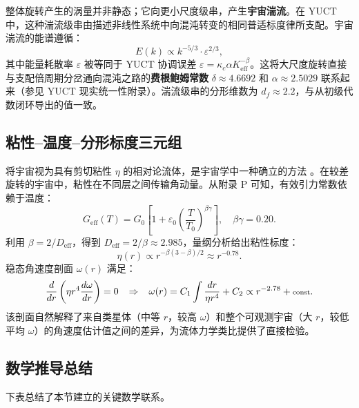 \documentclass[11pt,a4paper]{article}
\begin{document}
	整体旋转产生的涡量并非静态；它向更小尺度级串，产生\textbf{宇宙湍流}。在 YUCT 中，这种湍流级串由描述非线性系统中向混沌转变的相同普适标度律所支配。宇宙湍流的能谱遵循：
	\begin{equation}
		E(k) \propto k^{-5/3} \cdot \varepsilon^{2/3},
	\end{equation}
	其中能量耗散率 \(\varepsilon\) 被等同于 YUCT 协调误差 \(\varepsilon = \kappa_c \alpha K_{\mathrm{eff}}^{-\beta}\)。这将大尺度旋转直接与支配倍周期分岔通向混沌之路的\textbf{费根鲍姆常数} \(\delta \approx 4.6692\) 和 \(\alpha \approx 2.5029\) 联系起来（参见 YUCT 现实统一性附录）。湍流级串的分形维数为 \(d_f \approx 2.2\)，与从初级代数闭环导出的值一致。
	
	\subsection{粘性–温度–分形标度三元组}
	
	将宇宙视为具有剪切粘性 \(\eta\) 的相对论流体，是宇宙学中一种确立的方法 \cite{Giovannini2005}。在较差旋转的宇宙中，粘性在不同层之间传输角动量。从附录 P 可知，有效引力常数依赖于温度：
	\begin{equation}
		G_{\mathrm{eff}}(T) = G_0\left[1 + \varepsilon_0\left(\frac{T}{T_0}\right)^{\beta\gamma}\right], \quad \beta\gamma = 0.20.
	\end{equation}
	利用 \(\beta = 2/D_{\mathrm{eff}}\)，得到 \(D_{\mathrm{eff}} = 2/\beta \approx 2.985\)，量纲分析给出粘性标度：
	\begin{equation}
		\eta(r) \propto r^{-\beta(3-\beta)/2} \approx r^{-0.78}.
	\end{equation}
	稳态角速度剖面 \(\omega(r)\) 满足：
	\begin{equation}
		\scriptsize
		\frac{d}{dr}\left( \eta r^4 \frac{d\omega}{dr} \right) = 0 \quad \Rightarrow \quad \omega(r) = C_1 \int \frac{dr}{\eta r^4} + C_2 \propto r^{-2.78} + \text{const}.
	\end{equation}
	该剖面自然解释了来自类星体（中等 \(r\)，较高 \(\omega\)）和整个可观测宇宙（大 \(r\)，较低平均 \(\omega\)）的角速度估计值之间的差异，为流体力学类比提供了直接检验。
	
	\subsection{数学推导总结}
	
	下表总结了本节建立的关键数学联系。
	
\end{document}
